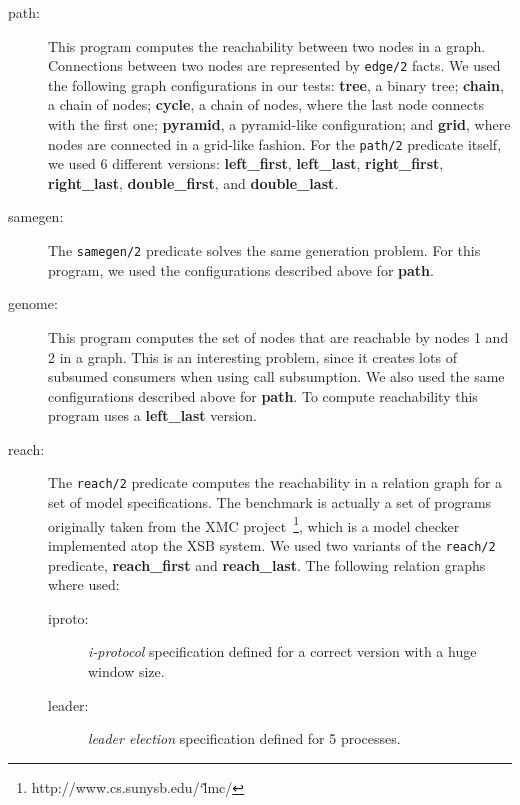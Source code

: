 \begin{description}
   
   \item[path:] This program computes the reachability between two nodes in a graph.
   Connections between two nodes are represented by \texttt{edge/2} facts.
   We used the following graph configurations in our tests: \textbf{tree}, a
   binary tree; \textbf{chain}, a chain of nodes; \textbf{cycle}, a chain of nodes, where the
   last node connects with the first one; \textbf{pyramid}, a pyramid-like configuration;
   and \textbf{grid}, where nodes are connected in a grid-like fashion.
   For the \texttt{path/2} predicate itself, we used 6 different versions: \textbf{left\_first},
   \textbf{left\_last}, \textbf{right\_first}, \textbf{right\_last},
   \textbf{double\_first}, and \textbf{double\_last}.
    
   \item[samegen:] The \texttt{samegen/2} predicate solves the same generation problem.
   For this program, we used the configurations described above for \textbf{path}.
   
   \item[genome:] This program computes the set of nodes that are reachable by nodes 1 and 2 in a graph.
   This is an interesting problem, since it creates lots of subsumed consumers when using
   call subsumption. We also used the same configurations described above for \textbf{path}.
   To compute reachability this program uses a \textbf{left\_last} version.
   
   \item[reach:] The \texttt{reach/2} predicate computes the reachability in a relation graph for a set of
   model specifications. The benchmark is actually a set of programs originally taken from the
   XMC project~\cite{RamakrishnanCR-00}\footnote{http://www.cs.sunysb.edu/\char`\~lmc/}, which is a model checker implemented
   atop the XSB system. We used two variants of the \texttt{reach/2} predicate,
   \textbf{reach\_first} and \textbf{reach\_last}.
   The following relation graphs where used:
   
      \begin{description}
         
         \item[iproto:] \emph{i-protocol} specification defined for a correct version with a huge window size.
         
         \item[leader:] \emph{leader election} specification defined for 5 processes.
         

\end{description}
\end{description}
